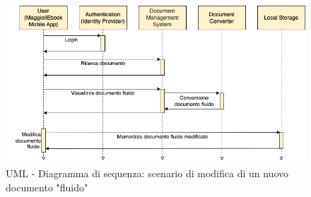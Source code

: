 \begin{figure}[H]
\centering
\includegraphics[width=1\textwidth]{img/caso-uso-sequenza-uml.png}
\caption{UML - Diagramma di sequenza: scenario di modifica di un nuovo documento "fluido"}
\end{figure}

